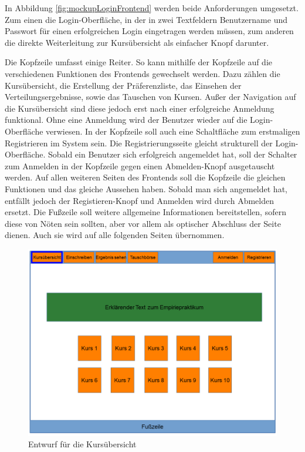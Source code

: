             In Abbildung \ref{fig:mockupLoginFrontend} werden beide Anforderungen umgesetzt.
            Zum einen die Login-Oberfläche, in der in zwei Textfeldern Benutzername und Passwort für einen erfolgreichen Login eingetragen werden müssen, zum anderen die direkte Weiterleitung zur Kursübersicht als einfacher Knopf darunter.

            Die Kopfzeile umfasst einige Reiter.
            So kann mithilfe der Kopfzeile auf die verschiedenen Funktionen des Frontends gewechselt werden. 
            Dazu zählen die Kursübersicht, die Erstellung der Präferenzliste, das Einsehen der Verteilungsergebnisse, sowie das Tauschen von Kursen.
            Außer der Navigation auf die Kursübersicht sind diese jedoch erst nach einer erfolgreiche Anmeldung funktional.
            Ohne eine Anmeldung wird der Benutzer wieder auf die Login-Oberfläche verwiesen.
            In der Kopfzeile soll auch eine Schaltfläche zum erstmaligen Registrieren im System sein.
            Die Registrierungsseite gleicht strukturell der Login-Oberfläche.
            Sobald ein Benutzer sich erfolgreich angemeldet hat, soll der Schalter zum Anmelden in der Kopfzeile gegen einen Abmelden-Knopf ausgetauscht werden.
			Auf allen weiteren Seiten des Frontends soll die Kopfzeile die gleichen Funktionen und das gleiche Aussehen haben. Sobald man sich angemeldet hat, entfällt jedoch der Registieren-Knopf und Anmelden wird durch Abmelden ersetzt.
            Die Fußzeile soll weitere allgemeine Informationen bereitstellen, sofern diese von Nöten sein sollten, aber vor allem als optischer Abschluss der Seite dienen.
            Auch sie wird auf alle folgenden Seiten übernommen.
			
			\begin{figure}[t]
				\centering
				\includegraphics[width=\textwidth]{./design/images/MockUpsFrontend/frontendCourses.png}
				\caption{Entwurf für die Kursübersicht}
				\label{fig:mockupCoursesFrontend}
			\end{figure}
			
